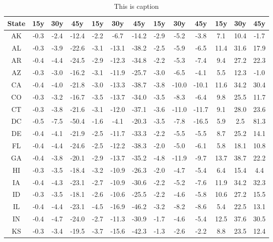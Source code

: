 \begin{table}
\centering
\caption{This is caption}
\label{tab:close_table}
\begin{tabular}{ccccccccccccc}
\toprule
State &  15y &  30y &   45y &  15y &   30y &    45y &  15y &   30y &   45y &  15y &  30y &  45y \\
\midrule
   AK & -0.3 & -2.4 & -12.4 & -2.2 &  -6.7 &  -14.2 & -2.9 &  -5.2 &  -3.8 &  7.1 & 10.4 & -1.7 \\
   AL & -0.3 & -3.9 & -22.6 & -3.1 & -13.1 &  -38.2 & -2.5 &  -5.9 &  -6.5 & 11.4 & 31.6 & 17.9 \\
   AR & -0.4 & -4.4 & -24.5 & -2.9 & -12.3 &  -34.8 & -2.2 &  -5.3 &  -7.4 &  9.4 & 27.2 & 22.3 \\
   AZ & -0.3 & -3.0 & -16.2 & -3.1 & -11.9 &  -25.7 & -3.0 &  -6.5 &  -4.1 &  5.5 & 12.3 & -1.0 \\
   CA & -0.4 & -4.0 & -21.8 & -3.0 & -13.3 &  -38.7 & -3.8 & -10.0 & -10.1 & 11.6 & 34.2 & 30.4 \\
   CO & -0.3 & -3.2 & -16.7 & -3.5 & -13.7 &  -34.0 & -3.5 &  -8.3 &  -6.4 &  9.8 & 25.5 & 11.7 \\
   CT & -0.3 & -3.8 & -21.6 & -3.1 & -12.0 &  -37.1 & -3.6 & -11.0 & -11.7 &  9.1 & 28.0 & 23.6 \\
   DC & -0.5 & -7.5 & -50.4 & -1.6 &  -4.1 &  -20.3 & -3.5 &  -7.8 & -16.5 &  5.9 &  2.5 & 81.3 \\
   DE & -0.4 & -4.1 & -21.9 & -2.5 & -11.7 &  -33.3 & -2.2 &  -5.5 &  -5.5 &  8.7 & 25.2 & 14.1 \\
   FL & -0.4 & -4.4 & -24.6 & -2.5 & -12.2 &  -38.3 & -2.0 &  -5.0 &  -6.1 &  5.8 & 18.1 & 10.8 \\
   GA & -0.4 & -3.8 & -20.1 & -2.9 & -13.7 &  -35.2 & -4.8 & -11.9 &  -9.7 & 13.7 & 38.7 & 22.2 \\
   HI & -0.3 & -3.5 & -18.4 & -3.2 & -10.9 &  -26.3 & -2.0 &  -4.7 &  -5.4 &  6.4 & 15.4 &  4.4 \\
   IA & -0.4 & -4.3 & -23.1 & -2.7 & -10.9 &  -30.6 & -2.2 &  -5.2 &  -7.6 & 11.9 & 34.2 & 32.3 \\
   ID & -0.3 & -3.5 & -18.1 & -2.6 & -10.6 &  -25.5 & -2.2 &  -4.6 &  -5.8 & 10.6 & 27.2 & 15.5 \\
   IL & -0.4 & -4.4 & -23.1 & -4.5 & -16.9 &  -46.2 & -3.2 &  -8.2 &  -8.6 &  5.4 & 22.5 & 13.1 \\
   IN & -0.4 & -4.7 & -24.0 & -2.7 & -11.3 &  -30.9 & -1.7 &  -4.6 &  -5.4 & 12.5 & 37.6 & 30.5 \\
   KS & -0.3 & -3.4 & -19.5 & -3.7 & -15.6 &  -42.3 & -1.3 &  -2.6 &  -2.2 &  8.8 & 23.5 & 12.4 \\

\end{tabular}
\end{table}
